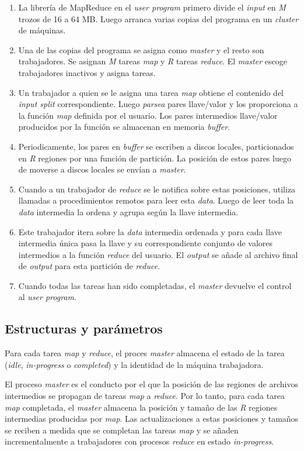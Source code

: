 \documentclass[spanish]{article}
\begin{document}
\begin{enumerate}
	\item La librer\'{i}a de MapReduce en el \textit{user program} primero divide el \textit{input} en \textit{M} trozos de 16 a 64 MB. Luego arranca varias copias del programa en un \textit{cluster} de m\'{a}quinas.
	\item Una de las copias del programa se asigna como \textit{master} y el resto son trabajadores. Se asignan \textit{M} tareas \textit{map} y \textit{R} tareas \textit{reduce}. El \textit{master} escoge trabajadores inactivos y asigna tareas.
	\item Un trabajador a quien se le asigna una tarea \textit{map} obtiene el contenido del \textit{input split} correspondiente. Luego \textit{parsea} pares llave/valor y los proporciona a la función \textit{map} definida por el usuario. Los pares intermedios llave/valor producidos por la función se almacenan en memoria \textit{buffer}.
	\item Periodicamente, los pares en \textit{buffer} se escriben a discos locales, particionados en \textit{R} regiones por una funci\'{o}n de partici\'{o}n. La posici\'{o}n de estos pares luego de moverse a discos locales se env\'{i}an a \textit{master}. 
	\item Cuando a un trabajador de \textit{reduce} se le notifica sobre estas posiciones, utiliza llamadas a procedimientos remotos para leer esta \textit{data}. Luego de leer toda la \textit{data} intermedia la ordena y agrupa seg\'{u}n la llave intermedia. 
	\item Este trabajador itera sobre la \textit{data} intermedia ordenada y para cada llave intermedia \'{u}nica pasa la llave y su correspondiente conjunto de valores intermedios a la funci\'{o}n \textit{reduce} del usuario. El \textit{output} se añade al archivo final de \textit{output} para esta partición de \textit{reduce}.
	\item Cuando todas las tareas han sido completadas, el \textit{master} devuelve el control al \textit{user program}. 
\end{enumerate}
\subsection{Estructuras y parámetros}
	Para cada tarea \textit{map} y \textit{reduce}, el proces \textit{master} almacena el estado de la tarea (\textit{idle}, \textit{in-progress} o \textit{completed}) y la identidad de la máquina trabajadora.
	
	El proceso \textit{master} es el conducto por el que la posición de las regiones de archivos intermedios se propagan de tareas \textit{map} a \textit{reduce}. Por lo tanto, para cada tarea \textit{map} completada, el \textit{master} almacena la posición y tamaño de las \textit{R} regiones intermedias producidas por \textit{map}. Las actualizaciones a estas posiciones y tamaños se reciben a medida que se completan las tareas \textit{map} y se añaden incrementalmente a trabajadores con procesos \textit{reduce} en estado \textit{in-progress}.
\end{document}
